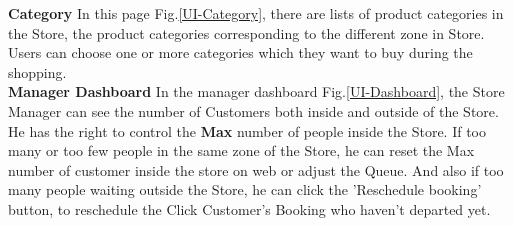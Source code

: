 \documentclass[a4paper,12pt]{report}
\begin{document}
\textbf{Category} In this page Fig.\ref{UI-Category}, there are lists of product categories in the Store, the product categories corresponding to the different zone in Store. Users can choose one or more categories which they want to buy during the shopping.\\ 


\textbf{Manager Dashboard} In the manager dashboard Fig.\ref{UI-Dashboard}, the Store Manager can see the number of Customers both inside and outside of the Store. He has the right to control the \textbf{Max} number of people inside the Store. If too many or too few people in the same zone of the Store, he can reset the Max number of customer inside the store on web or adjust the Queue. And also if too many people waiting outside the Store, he can click the 'Reschedule booking' button, to reschedule the Click Customer's Booking who haven't departed yet. \\ 
\end{document}
